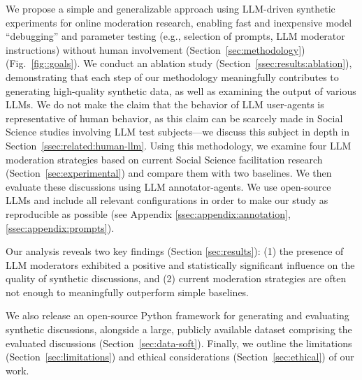 We propose a simple and generalizable approach using \ac{LLM}-driven synthetic experiments for online moderation research, enabling fast and inexpensive model “debugging” and parameter testing (e.g., selection of prompts, \ac{LLM} moderator instructions) without human involvement (Section~\ref{sec:methodology}) (Fig.~\ref{fig::goals}). We conduct an ablation study (Section~\ref{ssec:results:ablation}), demonstrating that each step of our methodology meaningfully contributes to generating high-quality synthetic data, as well as examining the output of various \acp{LLM}. We do not make the claim that the behavior of \ac{LLM} user-agents is representative of human behavior, as this claim can be scarcely made in Social Science studies involving \ac{LLM} test subjects—we discuss this subject in depth in Section~\ref{ssec:related:human-llm}. Using this methodology, we examine four \ac{LLM} moderation strategies based on current Social Science facilitation research (Section~\ref{sec:experimental})
and compare them with two baselines. We then evaluate these discussions using \ac{LLM} annotator-agents. We use open-source \acp{LLM} and include all relevant configurations in order to make our study as reproducible as possible (see Appendix \ref{ssec:appendix:annotation}, \ref{ssec:appendix:prompts}).


 Our analysis reveals two key findings (Section \ref{sec:results}): (1) the presence of \ac{LLM} moderators exhibited a positive and statistically significant influence on the quality of synthetic discussions, and (2) current moderation strategies are often not enough to meaningfully outperform simple baselines. %

We also release \syndisco an open-source Python framework for generating and evaluating synthetic discussions, alongside \vmd\datasetlink a large, publicly available dataset comprising the evaluated discussions (Section~\ref{sec:data-soft}). Finally, we outline the limitations (Section~\ref{sec:limitations}) and ethical considerations (Section~\ref{sec:ethical}) of our work.